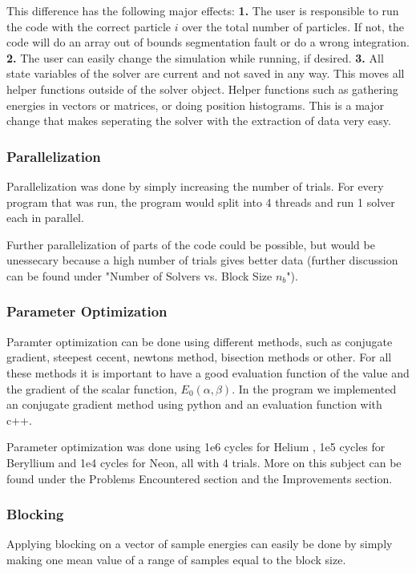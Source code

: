 \documentclass[twocolumns, a4paper,11pt,fleqn]{extarticle}
\begin{document}
This difference has the following major effects: 
{\color{MediumBlue}\bf1.} The user is responsible to run the code with the
correct particle $i$ over the total number of particles. If not, the code will
do an array out of bounds segmentation fault or do a wrong integration.
 {\color{MediumBlue}\bf2.} The user
can easily change the simulation while running, if desired. 
{\color{MediumBlue}\bf3.}
All state variables of the solver are current and not saved in any way. This moves
all helper functions outside of the solver object.
Helper functions such as gathering energies in vectors or matrices, 
or doing position histograms. This is a major change that makes seperating the solver
with the extraction of data very easy. 

\subsubsection{Parallelization}
Parallelization was done by simply increasing the number of trials. For every program
that was run, the program would split into 4 threads and run 1 solver each in parallel.

Further parallelization of parts of the code could be possible, but 
would be unessecary because a high number of trials gives better data
(further discussion can be found under "Number of Solvers vs. Block Size $n_b$"). 

\subsubsection{Parameter Optimization}
Paramter optimization can be done using different methods, such as conjugate gradient, 
steepest cecent, newtons method, bisection methods or other. For all these methods
it is important to have a good evaluation function of the value and the gradient of the
scalar function, $E_0(\alpha,\beta)$. In the program we implemented an conjugate gradient
method using python and an evaluation function with c++. 

Parameter optimization was done using 1e6 cycles for Helium , 
1e5 cycles for Beryllium and 1e4 cycles for Neon, all with 4 trials. More on this
subject can be found under the Problems Encountered section and the Improvements section.

\subsubsection{Blocking}
Applying blocking on a vector of sample energies can easily be done by simply making
one mean value of a range of samples equal to the block size. 
\end{document}

